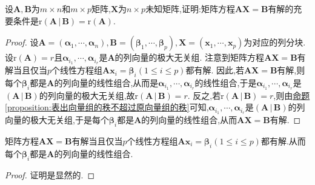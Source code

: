 \documentclass[lang=cn,newtx,10pt,scheme=chinese]{elegantbook}
\begin{document}
\begin{theorem}\label{theorem:矩阵方程有解的充要条件}
设\(\boldsymbol{A},\boldsymbol{B}\)为\(m\times n\)和\(m\times p\)矩阵,\(\boldsymbol{X}\)为\(n\times p\)未知矩阵,证明:矩阵方程\(\boldsymbol{A}\boldsymbol{X}=\boldsymbol{B}\)有解的充要条件是\(\mathrm{r}\left( \boldsymbol{A}\,|\,\boldsymbol{B} \right)=\mathrm{r}(\boldsymbol{A})\).
\end{theorem}
\begin{proof}
    设\(\boldsymbol{A}=(\boldsymbol{\alpha}_1,\cdots,\boldsymbol{\alpha}_n),\boldsymbol{B}=(\boldsymbol{\beta}_1,\cdots,\boldsymbol{\beta}_p),\boldsymbol{X}=(\boldsymbol{x}_1,\cdots,\boldsymbol{x}_p)\)为对应的列分块. 设\(\mathrm{r}(\boldsymbol{A}) = r\)且\(\boldsymbol{\alpha}_{i_1},\cdots,\boldsymbol{\alpha}_{i_r}\)是\(\boldsymbol{A}\)的列向量的极大无关组. 注意到矩阵方程\(\boldsymbol{A}\boldsymbol{X}=\boldsymbol{B}\)有解当且仅当\(p\)个线性方程组\(\boldsymbol{A}\boldsymbol{x}_i=\boldsymbol{\beta}_i(1\leq i\leq p)\)都有解. 因此,若\(\boldsymbol{A}\boldsymbol{X}=\boldsymbol{B}\)有解,则每个\(\boldsymbol{\beta}_i\)都是\(\boldsymbol{A}\)的列向量的线性组合,从而是\(\boldsymbol{\alpha}_{i_1},\cdots,\boldsymbol{\alpha}_{i_r}\)的线性组合,于是\(\boldsymbol{\alpha}_{i_1},\cdots,\boldsymbol{\alpha}_{i_r}\)是\(\left( \boldsymbol{A}\,|\,\boldsymbol{B} \right)\)的列向量的极大无关组,故\(\mathrm{r}\left( \boldsymbol{A}\,|\,\boldsymbol{B} \right) = r\). 反之,若\(\mathrm{r}\left( \boldsymbol{A}\,|\,\boldsymbol{B} \right) = r\),则由\hyperref[proposition:表出向量组的秩不超过原向量组的秩]{命题\ref{proposition:表出向量组的秩不超过原向量组的秩}}可知,\(\boldsymbol{\alpha}_{i_1},\cdots,\boldsymbol{\alpha}_{i_r}\)是\(\left( \boldsymbol{A}\,|\,\boldsymbol{B} \right)\)的列向量的极大无关组,于是每个\(\boldsymbol{\beta}_i\)都是\(\boldsymbol{A}\)的列向量的线性组合,从而\(\boldsymbol{A}\boldsymbol{X}=\boldsymbol{B}\)有解.
\end{proof}

\begin{proposition}
    矩阵方程\(\boldsymbol{A}\boldsymbol{X}=\boldsymbol{B}\)有解当且仅当\(p\)个线性方程组\(\boldsymbol{A}\boldsymbol{x}_i=\boldsymbol{\beta}_i(1\leq i\leq p)\)都有解.从而每个\(\boldsymbol{\beta}_i\)都是\(\boldsymbol{A}\)的列向量的线性组合.
\end{proposition}
\begin{proof}
    证明是显然的.
\end{proof}
\end{document}
